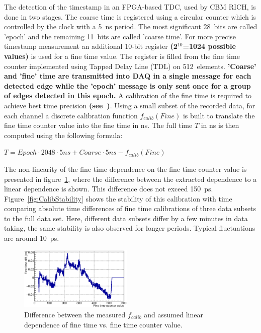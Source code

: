\documentclass[final,5p,times,twocolumn]{elsarticle}
\begin{document}
The detection of the timestamp in an FPGA-based TDC, used by CBM RICH, is done in two stages. The coarse time is registered using a circular counter which is controlled by the clock with a 5~ns period. The most significant 28~bits are called 'epoch' and the remaining 11~bits are called 'coarse time'. For more precise timestamp measurement an additional 10-bit register \textbf{(2$^{10}$=1024 possible values)} is used for a fine time value. The register is filled from the fine time counter implemented using Tapped Delay Line (TDL) on 512~elements.
\textbf{'Coarse' and 'fine' time are transmitted into DAQ in a single message for each detected edge while the 'epoch' message is only sent once for a group of edges detected in this epoch.}
A calibration of the fine time is required to achieve best time precision \textbf{(see~\cite{FINECALIB})}. Using a small subset of the recorded data, for each channel a discrete calibration function $ f_{calib}(Fine) $ is built to translate the fine time counter value into the fine time in ns. The full time $ T $ in ns is then computed using the following formula:

{\centering
$ T = Epoch \cdot 2048 \cdot 5ns + Coarse \cdot 5ns - f_{calib}(Fine) $ \\
}

The non-linearity of the fine time dependence on the fine time counter value is presented in figure~\ref{fig:CalibTableMinusLinear}, where the difference between the extracted dependence to a linear dependence is shown. This difference does not exceed 150~ps. Figure~\ref{fig:CalibStability} shows the stability of this calibration with time comparing absolute time differences of fine time calibrations of three data subsets to the full data set. Here, different data subsets differ by a few minutes in data taking, the same stability is also observed for longer periods. Typical fluctuations are around 10~ps.

\begin{figure}[h]
	\centering
	\includegraphics[width=0.48\textwidth]{figures/CalTableMinusFit_0010_01_feb2017.eps}
	\caption{Difference between the measured $ f_{calib} $ and assumed linear dependence of fine time vs. fine time counter value.}
	\label{fig:CalibTableMinusLinear}
\end{figure}
\end{document}
